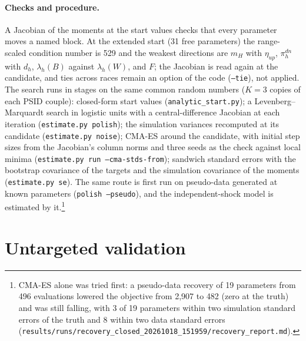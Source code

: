 \documentclass[11pt]{article}
\newcommand{\code}[1]{\texttt{#1}}
\newcommand{\1}{\mathbf{1}}
\begin{document}
\paragraph{Checks and procedure.} A Jacobian of the moments at the start values checks that every parameter moves a
named block. At the extended start (31 free parameters) the range-scaled condition number is 529 and the weakest
directions are $m_H$ with $\eta_{up}$, $\pi^{dn}_h$ with $d_h$, $\lambda_h(B)$ against $\lambda_h(W)$, and $F$; the
Jacobian is read again at the candidate, and ties across races remain an option of the code (\code{--tie}), not
applied. The search runs in stages on the same common random numbers ($K = 3$ copies of each PSID couple):
closed-form start values (\code{analytic\_start.py}); a Levenberg--Marquardt search in logistic units with a
central-difference Jacobian at each iteration (\code{estimate.py polish}); the simulation variances recomputed at its
candidate (\code{estimate.py noise}); CMA-ES around the candidate, with initial step sizes from the Jacobian's column
norms and three seeds as the check against local minima (\code{estimate.py run --cma-stds-from}); sandwich standard
errors with the bootstrap covariance of the targets and the simulation covariance of the moments
(\code{estimate.py se}). The same route is first run on pseudo-data generated at known parameters (\code{polish
--pseudo}), and the independent-shock model is estimated by it.\footnote{CMA-ES alone was tried first: a pseudo-data
recovery of 19 parameters from 496 evaluations lowered the objective from 2{,}907 to 482 (zero at the truth) and was
still falling, with 3 of 19 parameters within two simulation standard errors of the truth and 8 within two data
standard errors (\code{results/runs/recovery\_closed\_20261018\_151959/recovery\_report.md}).}

\section{Untargeted validation}\label{sec:valid}
\end{document}
